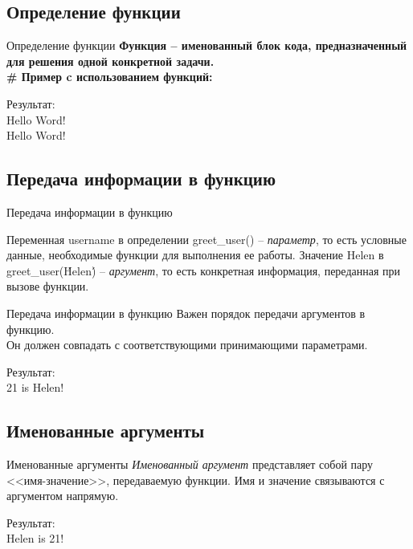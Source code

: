 \documentclass[12pt]{beamer}
\begin{document}
\subsection{Определение функции}
\begin{frame}{Определение функции}
\textbf{Функция -- именованный блок кода, предназначенный для решения одной конкретной задачи.} \\
\vspace{0.3cm}
\textbf{\# Пример c использованием функций:} \\
\vspace{0.2cm}

\vspace{0.5cm}
Результат: \\
Hello Word! \\
Hello Word! \\
\end{frame}


\subsection{Передача информации в функцию}
\begin{frame}{Передача информации в функцию}
\vspace{0.5cm}

\vspace{0.5cm}
Переменная username в определении greet\_user() -- \textit{параметр}, то есть условные данные, необходимые функции для выполнения ее работы. Значение Helen в greet\_user(\'Helen\') -- \textit{аргумент}, то есть конкретная информация, переданная при вызове функции.
\end{frame}


\begin{frame}{Передача информации в функцию}
Важен порядок передачи аргументов в функцию. \\Он должен совпадать с соответствующими принимающими параметрами. \\
\vspace{0.5cm}

\vspace{0.5cm}
Результат: \\
21 is Helen! \\
\end{frame}

\subsection{Именованные аргументы}
\begin{frame}{Именованные аргументы}
\textit{Именованный аргумент} представляет собой пару <<имя-значение>>, передаваемую функции. Имя и значение связываются с аргументом напрямую. \\
\vspace{0.5cm}

\vspace{0.5cm}
Результат: \\
Helen is 21! \\
\end{frame}
\end{document}
